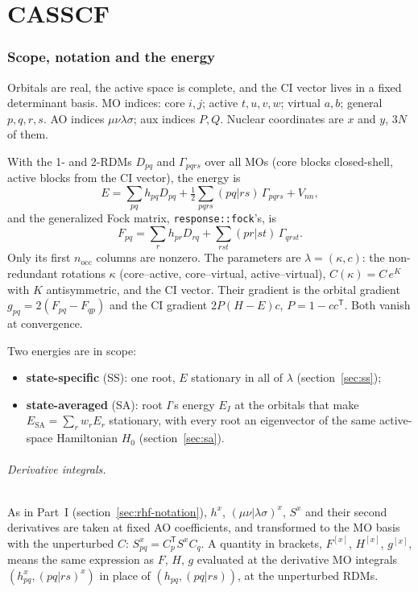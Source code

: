 \documentclass[11pt]{article}
\newcommand{\code}[1]{\texttt{#1}}
\begin{document}
\part{CASSCF}

\section{Scope, notation and the energy}
\label{sec:notation}

Orbitals are real, the active space is complete, and the CI vector lives in
a fixed determinant basis. MO indices: core $i,j$; active $t,u,v,w$;
virtual $a,b$; general $p,q,r,s$. AO indices $\mu\nu\lambda\sigma$; aux
indices $P,Q$. Nuclear coordinates are $x$ and $y$, $3N$ of them.

With the 1- and 2-RDMs $D_{pq}$ and $\Gamma_{pqrs}$ over all MOs (core
blocks closed-shell, active blocks from the CI vector), the energy is
\begin{equation}
  E = \sum_{pq} h_{pq} D_{pq}
  + \tfrac12\sum_{pqrs}(pq|rs)\,\Gamma_{pqrs} + V_{nn},
  \label{eq:energy}
\end{equation}
and the generalized Fock matrix, \code{response::fock}'s, is
\begin{equation}
  F_{pq} = \sum_r h_{pr}D_{rq} + \sum_{rst}(pr|st)\,\Gamma_{qrst}.
  \label{eq:fock}
\end{equation}
Only its first $n_{\mathrm{occ}}$ columns are nonzero. The parameters are
$\lambda = (\kappa, c)$: the non-redundant rotations $\kappa$ (core--active,
core--virtual, active--virtual), $C(\kappa) = C\,e^{K}$ with $K$
antisymmetric, and the CI vector. Their gradient is the orbital gradient
$g_{pq} = 2(F_{pq} - F_{qp})$ and the CI gradient $2P(H-E)c$, $P = 1 -
cc^{\mathsf T}$. Both vanish at convergence.

Two energies are in scope:
\begin{itemize}
  \item \textbf{state-specific} (SS): one root, $E$ stationary in all of
        $\lambda$ (section~\ref{sec:ss});
  \item \textbf{state-averaged} (SA): root $I$'s energy $E_I$ at the
        orbitals that make $E_{\mathrm{SA}} = \sum_r w_r E_r$ stationary,
        with every root an eigenvector of the same active-space
        Hamiltonian $H_0$ (section~\ref{sec:sa}).
\end{itemize}

\paragraph{Derivative integrals.} As in Part~I
(section~\ref{sec:rhf-notation}), $h^x$, $(\mu\nu|\lambda\sigma)^x$, $S^x$
and their second derivatives are taken at fixed AO coefficients, and
transformed to the MO basis with the unperturbed $C$: $S^x_{pq} =
C_p^{\mathsf T}S^xC_q$. A quantity in brackets, $F^{[x]}$, $H^{[x]}$,
$g^{[x]}$, means the same expression as $F$, $H$, $g$ evaluated at the
derivative MO integrals $(h^x_{pq}, (pq|rs)^x)$ in place of $(h_{pq},
(pq|rs))$, at the unperturbed RDMs.
\end{document}
